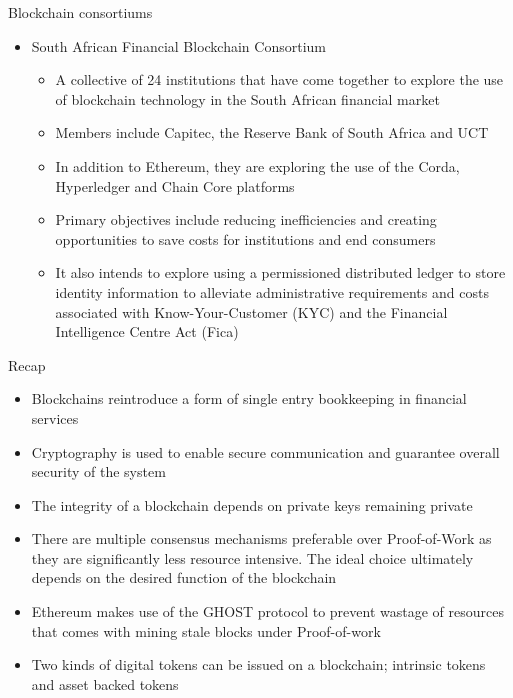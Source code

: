 \documentclass[9pt]{beamer}
\begin{document}

\begin{frame}{Blockchain consortiums}
	\begin{itemize}
		\item South African Financial Blockchain Consortium
		\begin{itemize}
			\item A collective of 24 institutions that have come together to explore the use of blockchain technology in the South African financial market
			\item Members include Capitec, the Reserve Bank of South Africa and UCT
			\item In addition to Ethereum, they are exploring the use of the Corda, Hyperledger and Chain Core platforms
			\item Primary objectives include reducing inefficiencies and creating opportunities to save costs for institutions and end consumers
			\item It also intends to explore using a permissioned distributed ledger to store identity information to alleviate administrative requirements and costs associated with Know-Your-Customer (KYC) and the Financial Intelligence Centre Act (Fica)
		\end{itemize}
	\end{itemize}
\end{frame}



\begin{frame}{Recap}
	\begin{itemize}
		\item Blockchains reintroduce a form of single entry bookkeeping in financial services
		\item Cryptography is used to enable secure communication and guarantee overall security of the system
		\item The integrity of a blockchain depends on private keys remaining private
		\item There are multiple consensus mechanisms preferable over Proof-of-Work as they are significantly less resource intensive. The ideal choice ultimately depends on the desired function of the blockchain
		\item Ethereum makes use of the GHOST protocol to prevent wastage of resources that comes with mining stale blocks under Proof-of-work
		\item Two kinds of digital tokens can be issued on a blockchain; intrinsic tokens and asset backed tokens
	\end{itemize}
\end{frame}
\end{document}
